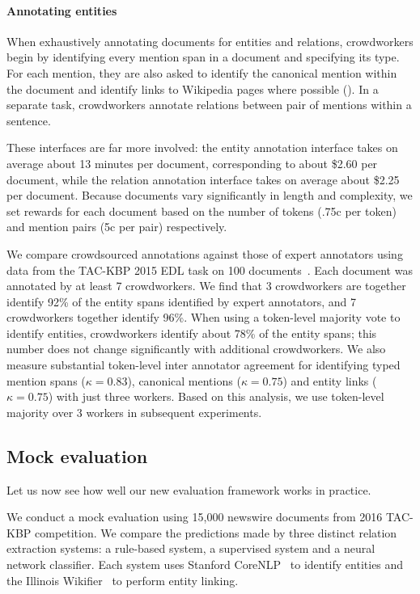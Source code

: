 \paragraph{Annotating entities}
When exhaustively annotating documents for entities and relations,
  crowdworkers begin by identifying every mention span in a document and specifying its type.
  For each mention, they are also asked to identify the canonical mention within the document
  and identify links to Wikipedia pages where possible ().
In a separate task, crowdworkers annotate relations between pair of mentions within a sentence.

These interfaces are far more involved: the entity annotation interface takes on average about 13 minutes per document, corresponding to about \$2.60 per document, while the relation annotation interface takes on average about \$2.25 per document.
Because documents vary significantly in length and complexity, we set rewards for each document based on the number of tokens (.75c per token) and mention pairs (5c per pair) respectively.

We compare crowdsourced annotations against those of expert annotators using data from the TAC-KBP 2015 EDL task on 100 documents~\citep{}.
Each document was annotated by at least 7 crowdworkers.
We find that 3 crowdworkers are together identify 92\% of the entity spans identified by expert annotators,
  and 7 crowdworkers together identify 96\%.
When using a token-level majority vote to identify entities, crowdworkers identify about 78\% of the entity spans; this number does not change significantly with additional crowdworkers.
We also measure substantial token-level inter annotator agreement for identifying typed mention spans ($\kappa = 0.83$), canonical mentions ($\kappa = 0.75$) and entity links ($\kappa = 0.75$) with just three workers.
Based on this analysis, we use token-level majority over 3 workers in subsequent experiments.

\subsection{Mock evaluation}
Let us now see how well our new evaluation framework works in practice.

We conduct a mock evaluation using 15,000 newswire documents from 2016 TAC-KBP competition.
We compare the predictions made by three distinct relation extraction systems: a rule-based system, a supervised system and a neural network classifier.
Each system uses Stanford CoreNLP~\citep{} to identify entities and the Illinois Wikifier~\citep{} to perform entity linking. 

